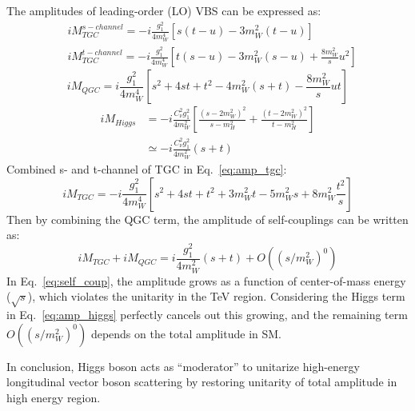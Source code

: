 The amplitudes of leading-order (LO) VBS can be expressed as:
\begin{equation} \label{eq:amp_tgc}
\begin{split}
	& {iM}_{TGC}^{s-channel} = -i\frac{g_{1}^{2}}{4m_{W}^{4}}[s(t-u)-3m_{W}^{2}(t-u)] \\
	& {iM}_{TGC}^{t-channel} = -i\frac{g_{1}^{2}}{4m_{W}^{4}}\left[t(s-u)-3m_{W}^{2}(s-u)+\frac{8m_{W}^{2}}{s}u^{2}\right]
\end{split}
\end{equation}
\begin{equation}
	{iM}_{QGC} = i\frac{g_{1}^{2}}{4m_{W}^{4}}\left[s^{2}+4st+t^{2}-4m_{W}^{2}(s+t)-\frac{8m_{W}^{2}}{s}ut\right]
\end{equation}
\begin{equation} \label{eq:amp_higgs}
\begin{split}
	{iM}_{Higgs} & = -i\frac{C_{\nu}^{2}g_{1}^{2}}{4m_{W}^{2}}\left[\frac{(s-2m_{W}^{2})^{2}}{s-m_{H}^{2}} + \frac{(t-2m_{W}^{2})^{2}}{t-m_{H}^{2}}\right] \\
                     & \simeq -i\frac{C_{\nu}^{2}g_{1}^{2}}{4m_{W}^{2}}(s+t)
\end{split}
\end{equation}
Combined s- and t-channel of TGC in Eq.~\ref{eq:amp_tgc}:
\begin{equation}
	{iM}_{TGC} = -i\frac{g_{1}^{2}}{4m_{W}^{4}}\left[s^{2}+4st+t^{2}+3m_{W}^{2}t-5m_{W}^{2}s+8m_{W}^{2}\frac{t^{2}}{s}\right]
\end{equation}
Then by combining the QGC term, the amplitude of self-couplings can be written as:
\begin{equation} \label{eq:self_coup}
	{iM}_{TGC} + {iM}_{QGC}= i\frac{g_{1}^{2}}{4m_{W}^{2}}(s+t) + {O}((s/m_{W}^{2})^{0})
\end{equation}
In Eq.~\ref{eq:self_coup}, the amplitude grows as a function of center-of-mass energy ($\sqrt{s}$),
which violates the unitarity in the TeV region.
Considering the Higgs term in Eq.~\ref{eq:amp_higgs} perfectly cancels out this growing,
and the remaining term ${O}((s/m_{W}^{2})^{0})$ depends on the total amplitude in SM.

In conclusion, Higgs boson acts as “moderator” to unitarize high-energy longitudinal vector boson scattering
by restoring unitarity of total amplitude in high energy region.
